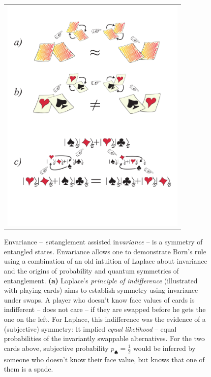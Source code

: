 \documentclass[aps,amsmath,amssymb,amsfonts,12pt]{revtex4-1}
\newcommand{\+}         {\dagger}
\begin{document}
{\newpage
\begin{figure}[ht]
\begin{tabular}{l}
\vspace{-0.25in}
\includegraphics[width=3.6in]{allcards.pdf}\\
\end{tabular}
\caption{\scriptsize
Envariance -- {\it en}tanglement assisted in{\it variance} -- is a symmetry of entangled states. Envariance allows one to demonstrate Born's rule \cite{76,78,75} using a combination of an old intuition of Laplace \cite{40}
about invariance and the origins of probability and quantum symmetries of entanglement.
{\bf (a)} Laplace's {\it principle of indifference} (illustrated with playing cards) aims to establish
 symmetry using invariance under swaps.
A player who doesn't know face values of cards is  indifferent -- does not care -- if they are swapped before
he gets the one on the left. For Laplace, this indifference was the evidence of a (subjective) symmetry: 
It implied {\it equal likelihood} -- equal probabilities of the invariantly swappable
alternatives. For the two cards above, subjective probability $p_\spadesuit ={ \frac 1 2}$ would be inferred by someone who doesn't know their face value, but knows that one of them is a spade. 
}
\end{figure}}
\end{document}
